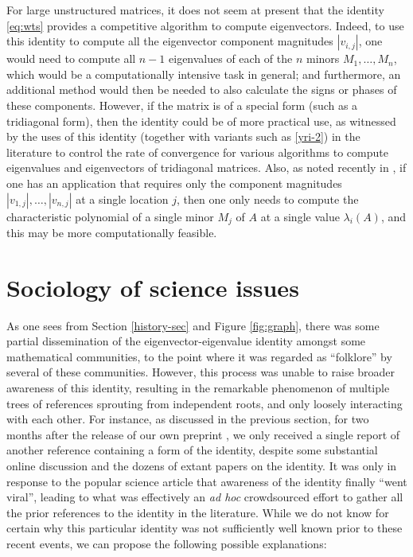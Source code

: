 \documentclass[12pt]{amsart}
\begin{document}
For large unstructured matrices, it does not seem at present that the identity \eqref{eq:wts} provides a competitive algorithm to compute eigenvectors.  Indeed, to use this identity to compute all the eigenvector component magnitudes $|v_{i,j}|$, one would need to compute all $n-1$ eigenvalues of each of the $n$ minors $M_1,\dots,M_n$, which would be a computationally intensive task in general; and furthermore, an additional method would then be needed to also calculate the signs or phases of these components.  However, if the matrix is of a special form (such as a tridiagonal form), then the identity could be of more practical use, as witnessed by the uses of this identity (together with variants such as \eqref{yri-2}) in the literature to control the rate of convergence for various algorithms to compute eigenvalues and eigenvectors of tridiagonal matrices.  Also, as noted recently in \cite{Kausel2018}, if one has an application that requires only the component magnitudes $|v_{1,j}|,\dots,|v_{n,j}|$ at a single location $j$, then one only needs to compute the characteristic polynomial of a single minor $M_j$ of $A$ at a single value $\lambda_i(A)$, and this may be more computationally feasible.

\section{Sociology of science issues}

As one sees from Section \ref{history-sec} and Figure \ref{fig:graph}, there was some partial dissemination of the eigenvector-eigenvalue identity amongst some mathematical communities, to the point where it was regarded as ``folklore'' by several of these communities.  However, this process was unable to raise broader awareness of this identity, resulting in the remarkable phenomenon of multiple trees of references sprouting from independent roots, and only loosely interacting with each other.  For instance, as discussed in the previous section, for two months after the release of our own preprint \cite{DPTZ}, we only received a single report of another reference \cite{2019arXiv190505314F} containing a form of the identity, despite some substantial online discussion and the dozens of extant papers on the identity.  It was only in response to the popular science article \cite{wolchover-2019} that awareness of the identity finally ``went viral'', leading to what was effectively an \emph{ad hoc} crowdsourced effort to gather all the prior references to the identity in the literature.    
While we do not know for certain why this particular identity was not sufficiently well known prior to these recent events, we can propose the following possible explanations:
\end{document}
